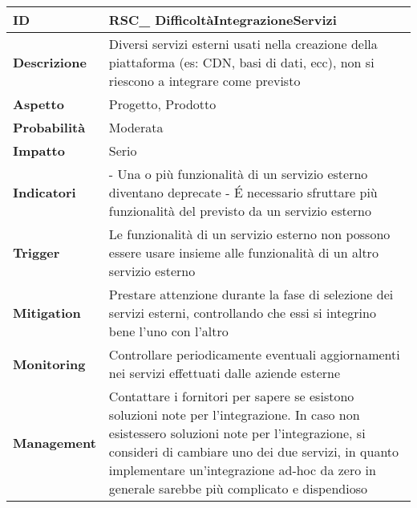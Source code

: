 \begin{tabular}{|p{2.2cm}|p{9.6cm}| } 
 	\hline
	 \textbf{ID} & RSC\_ DifficoltàIntegrazioneServizi\\ [0.5ex] 
	\hline
	\textbf{Descrizione} & Diversi servizi esterni usati nella creazione della piattaforma (es: CDN, basi di dati, ecc), non si riescono a integrare come previsto\\ 
	\hline
	\textbf{Aspetto} &  Progetto, Prodotto\\ 
	\hline
	\textbf{Probabilità} &  Moderata\\ 
	\hline
	\textbf{Impatto} &  Serio\\ 
	\hline
	\textbf{Indicatori} & - Una o più funzionalità di un servizio esterno diventano deprecate\newline
				  - \'E necessario sfruttare più funzionalità del previsto da un servizio esterno \\
	\hline
	\textbf{Trigger} & Le funzionalità di un servizio esterno non possono essere usare insieme alle funzionalità di un altro servizio esterno\\
	\hline
	\textbf{Mitigation} & Prestare attenzione durante la fase di selezione dei servizi esterni, controllando che essi si integrino bene l'uno con l'altro\\ 
	\hline
	\textbf{Monitoring} & Controllare periodicamente eventuali aggiornamenti nei servizi effettuati dalle aziende esterne\\ 
	\hline
	\textbf{Management} & Contattare i fornitori per sapere se esistono soluzioni note per l'integrazione. In caso non esistessero soluzioni note per l'integrazione, si consideri di cambiare uno dei due servizi, in quanto implementare un'integrazione ad-hoc da zero in generale sarebbe più complicato e dispendioso\\ 
	\hline
\end{tabular}

